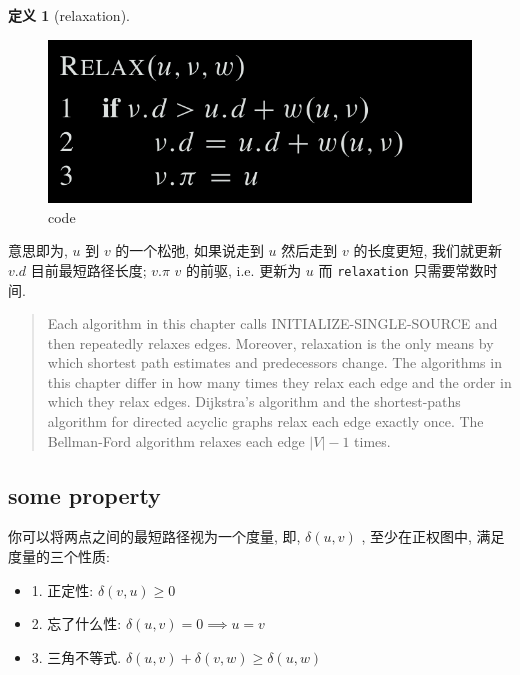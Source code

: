 \documentclass[a4paper, 10pt]{ctexart} %
\newtheorem{definition}{定义}
\begin{document}
\begin{definition}[relaxation]
\end{definition}
\begin{figure}[H]
    \centering
    \includegraphics[scale = 0.5]{sssp3.png}
    \caption{code}
    \label{relaxation}
\end{figure}

意思即为, $u$ 到 $v$ 的一个松弛, 如果说走到 $u$ 然后走到 $v$ 的长度更短, 我们就更新 $v.d$ 目前最短路径长度; $v.\pi$ $v$ 的前驱, i.e. 更新为 $u$
而 \verb|relaxation| 只需要常数时间. 

\begin{quotation}
Each algorithm in this chapter calls INITIALIZE-SINGLE-SOURCE and then repeatedly relaxes edges. Moreover, relaxation is the only means by which shortest
path estimates and predecessors change. The algorithms in this chapter differ in
how many times they relax each edge and the order in which they relax edges. Dijkstra's algorithm and the shortest-paths algorithm for directed acyclic graphs relax
each edge exactly once. The Bellman-Ford algorithm relaxes each edge $\left| V \right|  -1$
times.
\end{quotation}


\subsection{some property}

你可以将两点之间的最短路径视为一个度量, 即, $\delta \left(u ,v\right)$ , 至少在正权图中, 满足度量的三个性质: 

\begin{itemize}
    \item 1. 正定性: $\delta \left(v, u\right) \ge 0$
    \item 2. 忘了什么性: $\delta \left(u,v\right) = 0   \implies u = v$ 
    \item 3. 三角不等式. $\delta (u, v ) + \delta \left(v , w\right) \ge \delta (u ,w)$
\end{itemize}
\end{document}
